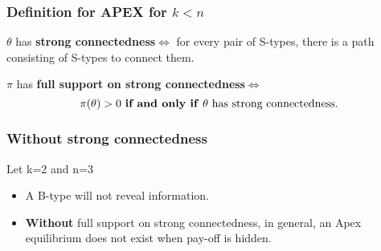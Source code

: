 \documentclass[8pt]{beamer}
\begin{document}


\begin{frame}
  \frametitle{Definition for APEX for $k<n$}


\begin{definition}
$\theta$ has \textbf{strong connectedness}$\Leftrightarrow$ for every pair of S-types, there is a path consisting of S-types to connect them.
\end{definition}  

\begin{definition}
$\pi$ has \textbf{full support on strong connectedness}$\Leftrightarrow$ 
\[\text{$\pi(\theta)>0$ \textbf{if and only if} $\theta$ has strong connectedness.}\]
\end{definition}  


\end{frame}


\begin{frame}
  \frametitle{Without strong connectedness}
Let k=\alert{2} and n=\alert{3}
\begin{center}
\end{center}

\begin{itemize}


\item A B-type will not reveal information.
\item \textbf{Without} {full support on strong connectedness}, in general, an Apex equilibrium does not exist when pay-off is hidden.

\end{itemize}
\end{frame}
\end{document}
